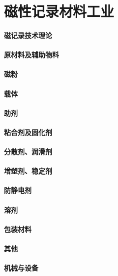 \documentclass[UTF8]{../../ApplicationUniverse}
\begin{document}
\chapter{磁性记录材料工业}
\subsubsection{磁记录技术理论}
\subsubsection{原材料及辅助物料}
    \subsubsection{磁粉}
    \subsubsection{载体}
    \subsubsection{助剂}
        \subsubsection{粘合剂及固化剂}
        \subsubsection{分散剂、润滑剂}
        \subsubsection{增塑剂、稳定剂}
        \subsubsection{防静电剂}
        \subsubsection{溶剂}
    \subsubsection{包装材料}
    \subsubsection{其他}
\subsubsection{机械与设备}
\end{document}
